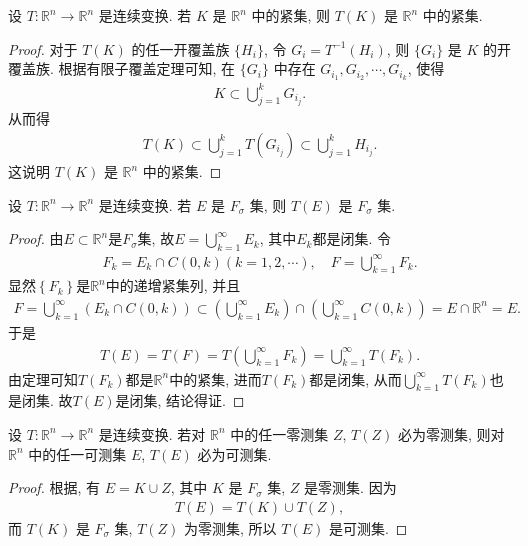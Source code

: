 \documentclass[../../main.tex]{subfiles}%
\begin{document}
\begin{theorem}
设 $T:\mathbb{R}^n\to\mathbb{R}^n$ 是连续变换. 若 $K$ 是 $\mathbb{R}^n$ 中的紧集, 则 $T(K)$ 是 $\mathbb{R}^n$ 中的紧集.
\end{theorem}
\begin{proof}
对于 $T(K)$ 的任一开覆盖族 $\{H_i\}$, 令 $G_i = T^{-1}(H_i)$, 则 $\{G_i\}$ 是 $K$ 的开覆盖族. 根据有限子覆盖定理可知, 在 $\{G_i\}$ 中存在 $G_{i_1},G_{i_2},\cdots,G_{i_k}$, 使得
\begin{align*}
K\subset\bigcup_{j = 1}^{k}G_{i_j}.
\end{align*}
从而得
\begin{align*}
T(K)\subset\bigcup_{j = 1}^{k}T(G_{i_j})\subset\bigcup_{j = 1}^{k}H_{i_j}.
\end{align*}
这说明 $T(K)$ 是 $\mathbb{R}^n$ 中的紧集.
\end{proof}

\begin{corollary}
设 $T:\mathbb{R}^n\to\mathbb{R}^n$ 是连续变换. 若 $E$ 是 $F_\sigma$ 集, 则 $T(E)$ 是 $F_\sigma$ 集.
\end{corollary}
\begin{proof}
由$E\subset \mathbb{R} ^n$是$F_{\sigma}$集, 故$E=\bigcup_{k=1}^{\infty}{E_k}$, 其中$E_k$都是闭集. 令
\begin{align*}
F_k=E_k\cap C\left( 0,k \right) \left( k=1,2,\cdots \right) ,\quad F=\bigcup_{k=1}^{\infty}{F_k}.
\end{align*}
显然$\left\{ F_k \right\}$是$\mathbb{R} ^n$中的递增紧集列, 并且
\begin{align*}
F=\bigcup_{k=1}^{\infty}{\left( E_k\cap C\left( 0,k \right) \right)}\subset \left( \bigcup_{k=1}^{\infty}{E_k} \right) \cap \left( \bigcup_{k=1}^{\infty}{C\left( 0,k \right)} \right) =E\cap \mathbb{R} ^n=E.
\end{align*}
于是
\begin{align*}
T\left( E \right) =T\left( F \right) =T\left( \bigcup_{k=1}^{\infty}{F_k} \right) =\bigcup_{k=1}^{\infty}{T\left( F_k \right)}.
\end{align*}
由定理可知$T\left( F_k \right)$都是$\mathbb{R} ^n$中的紧集, 进而$T\left( F_k \right)$都是闭集, 从而$\bigcup_{k=1}^{\infty}{T\left( F_k \right)}$也是闭集. 故$T\left( E \right)$是闭集, 结论得证.
\end{proof}

\begin{corollary}
设 $T:\mathbb{R}^n\to\mathbb{R}^n$ 是连续变换. 若对 $\mathbb{R}^n$ 中的任一零测集 $Z$, $T(Z)$ 必为零测集, 则对 $\mathbb{R}^n$ 中的任一可测集 $E$, $T(E)$ 必为可测集.
\end{corollary}
\begin{proof}
根据, 有 $E = K\cup Z$, 其中 $K$ 是 $F_\sigma$ 集, $Z$ 是零测集. 因为
\begin{align*}
T(E) = T(K)\cup T(Z),
\end{align*}
而 $T(K)$ 是 $F_\sigma$ 集, $T(Z)$ 为零测集, 所以 $T(E)$ 是可测集.
\end{proof}
\end{document}
